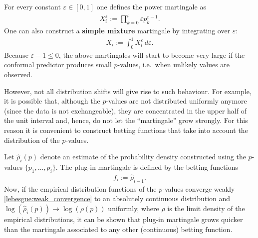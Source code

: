     \begin{method}
        For every constant $\varepsilon\in[0,1]$ one defines the power martingale as
        \begin{gather}
            X^\varepsilon_i := \prod_{k=0}^i\varepsilon p^{\varepsilon-1}_k.
        \end{gather}
        One can also construct a \textbf{simple mixture} martingale by integrating over $\varepsilon$:
        \begin{gather}
            X_i := \int_0^1X^\varepsilon_i\,d\varepsilon.
        \end{gather}
        Because $\varepsilon-1\leq0$, the above martingales will start to become very large if the conformal predictor produces small $p$-values, i.e.~when unlikely values are observed.
    \end{method}
    However, not all distribution shifts will give rise to such behaviour. For example, it is possible that, although the $p$-values are not distributed uniformly anymore (since the data is not exchangeable), they are concentrated in the upper half of the unit interval and, hence, do not let the ``martingale'' grow strongly. For this reason it is convenient to construct betting functions that take into account the distribution of the $p$-values.
    \begin{method}
        Let $\hat{\rho}_i(p)$ denote an estimate of the probability density constructed using the $p$-values $\{p_1,\ldots,p_i\}$. The plug-in martingale is defined by the betting functions
        \begin{gather}
            f_i := \hat{\rho}_{i-1}.
        \end{gather}
        Now, if the empirical distribution functions of the $p$-values converge weakly \ref{lebesgue:weak_convergence} to an absolutely continuous distribution and $\log(\hat{\rho}_i(p))\longrightarrow\log(\rho(p))$ uniformly, where $\rho$ is the limit density of the empirical distributions, it can be shown that plug-in martingale grows quicker than the martingale associated to any other (continuous) betting function.
    \end{method}

